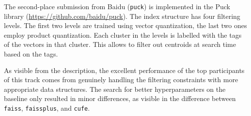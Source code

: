 The second-place submission from Baidu (\texttt{puck}) is implemented in the Puck library (\url{https://github.com/baidu/puck}). 
The index structure has four filtering levels. 
The first two levels are trained using vector quantization, the last two ones employ product quantization.
Each cluster in the levels is labelled with the tags of the vectors in that cluster. 
This allows to filter out centroids at search time based on the tags.%

As visible from the description, the excellent performance of the top participants of this track comes from genuinely handling the filtering constraints with more appropriate data structures.  
The search for better hyperparameters on the baseline only resulted in minor differences, as visible in the difference between \texttt{faiss}, \texttt{faissplus}, and \texttt{cufe}.


\ifnotarxiv

